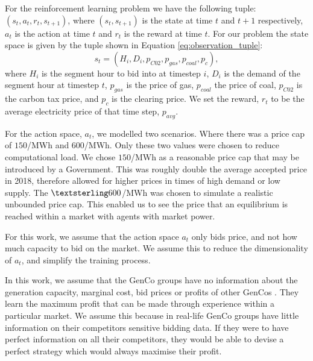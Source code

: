 For the reinforcement learning problem we have the following tuple: $(s_t,a_t,r_t,s_{t+1})$, where $(s_t, s_{t+1})$ is the state at time $t$ and $t+1$ respectively, $a_t$ is the action at time $t$ and $r_t$ is the reward at time $t$. For our problem the state space is given by the tuple shown in Equation \ref{eq:observation_tuple}:
\begin{equation}
\label{eq:observation_tuple}
s_t=(H_i,D_i,p_{C02},p_{gas},p_{coal},p_{c}),
\end{equation}
\noindent where $H_i$ is the segment hour to bid into at timestep $i$, $D_i$ is the demand of the segment hour at timestep $t$, $p_{gas}$ is the price of gas, $p_{coal}$ the price of coal, $p_{C02}$ is the carbon tax price, and $p_{c}$ is the clearing price. We set the reward, $r_t$ to be the average electricity price of that time step, $p_{avg}$.

For the action space, $a_t$, we modelled two scenarios. Where there was a price cap of \textsterling$150$/MWh and \textsterling$600$/MWh. Only these two values were chosen to reduce computational load. We chose \textsterling$150$/MWh as a reasonable price cap that may be introduced by a Government. This was roughly double the average accepted price in 2018, therefore allowed for higher prices in times of high demand or low supply. The $\textsterling 600$/MWh was chosen to simulate a realistic unbounded price cap. This enabled us to see the price that an equilibrium is reached within a market with agents with market power. 

For this work, we assume that the action space $a_t$ only bids price, and not how much capacity to bid on the market. We assume this to reduce the dimensionality of $a_t$, and simplify the training process.

In this work, we assume that the GenCo groups have no information about the generation capacity, marginal cost, bid prices or profits of other GenCos \cite{EsmaeiliAliabadi2017}. They learn the maximum profit that can be made through experience within a particular market. We assume this because in real-life GenCo groups have little information on their competitors sensitive bidding data. If they were to have perfect information on all their competitors, they would be able to devise a perfect strategy which would always maximise their profit.


